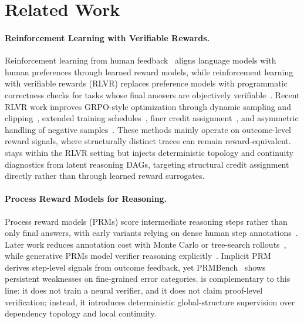 \section{Related Work}
\label{sec:related_work}

\paragraph{Reinforcement Learning with Verifiable Rewards.}
Reinforcement learning from human feedback~\citep{ouyang2022training} aligns language models with human preferences through learned reward models, while reinforcement learning with verifiable rewards (RLVR) replaces preference models with programmatic correctness checks for tasks whose final answers are objectively verifiable~\citep{shao2024deepseekmath,deepseekr1,lambert2024tulu3}.
Recent RLVR work improves GRPO-style optimization through dynamic sampling and clipping~\citep{yu2025dapo}, extended training schedules~\citep{liu2025prorl}, finer credit assignment~\citep{kazemnejad2025vineppo}, and asymmetric handling of negative samples~\citep{zhu2025negsample}. These methods mainly operate on outcome-level reward signals, where structurally distinct traces can remain reward-equivalent. \method stays within the RLVR setting but injects deterministic topology and continuity diagnostics from latent reasoning DAGs, targeting structural credit assignment directly rather than through learned reward surrogates.

\paragraph{Process Reward Models for Reasoning.}
Process reward models (PRMs) score intermediate reasoning steps rather than only final answers, with early variants relying on dense human step annotations~\citep{lightman2023lets}.
Later work reduces annotation cost with Monte Carlo or tree-search rollouts~\citep{wang2024math,luo2024omegaprm,zhang2025qwen25mathprm}, while generative PRMs model verifier reasoning explicitly~\citep{thinkprm2025,genprm2026,she2025rprm}. Implicit PRM~\citep{yuan2024implicitprm} derives step-level signals from outcome feedback, yet PRMBench~\citep{song2025prmbench} shows persistent weaknesses on fine-grained error categories. \method is complementary to this line: it does not train a neural verifier, and it does not claim proof-level verification; instead, it introduces deterministic global-structure supervision over dependency topology and local continuity.

